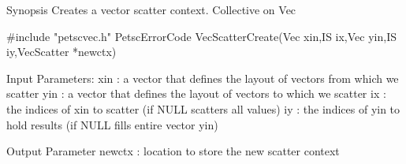 Synopsis
Creates a vector scatter context. Collective on Vec

#include "petscvec.h"    
PetscErrorCode VecScatterCreate(Vec xin,IS ix,Vec yin,IS iy,VecScatter *newctx)

Input Parameters:
xin : a vector that defines the layout of vectors from which we scatter
yin : a vector that defines the layout of vectors to which we scatter
ix : the indices of xin to scatter (if NULL scatters all values)
iy : the indices of yin to hold results (if NULL fills entire vector yin)

Output Parameter
newctx : location to store the new scatter context 
